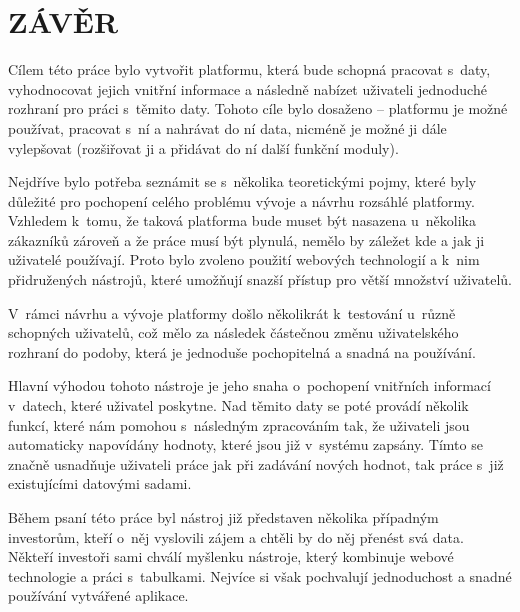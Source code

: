 \chapter*{ZÁVĚR}
\par Cílem této práce bylo vytvořit platformu, která bude schopná pracovat s~daty, vyhodnocovat jejich vnitřní informace a následně nabízet uživateli jednoduché rozhraní pro práci s~těmito daty. Tohoto cíle bylo dosaženo -- platformu je možné používat, pracovat s~ní a nahrávat do ní data, nicméně je možné ji dále vylepšovat (rozšiřovat ji a přidávat do ní další funkční moduly).

\par Nejdříve bylo potřeba seznámit se s~několika teoretickými pojmy, které byly důležité pro pochopení celého problému vývoje a návrhu rozsáhlé platformy. Vzhledem k~tomu, že taková platforma bude muset být nasazena u~několika zákazníků zároveň a že práce musí být plynulá, nemělo by záležet kde a jak ji uživatelé používají. Proto bylo zvoleno použití webových technologií a k~nim přidružených nástrojů, které umožňují snazší přístup pro větší množství uživatelů.

\par V~rámci návrhu a vývoje platformy došlo několikrát k~testování u~různě schopných uživatelů, což mělo za následek částečnou změnu uživatelského rozhraní do podoby, která je  jednoduše pochopitelná a snadná na používání.

\par Hlavní výhodou tohoto nástroje je jeho snaha o~pochopení vnitřních informací v~datech, které uživatel poskytne. Nad těmito daty se poté provádí několik funkcí, které nám pomohou s~následným zpracováním tak, že uživateli jsou automaticky napovídány hodnoty, které jsou již v~systému zapsány. Tímto se značně usnadňuje uživateli práce jak při zadávání nových hodnot, tak práce s~již existujícími datovými sadami.

\par Během psaní této práce byl nástroj již představen několika případným investorům, kteří o~něj vyslovili zájem a chtěli by do něj přenést svá data. Někteří investoři sami chválí myšlenku nástroje, který kombinuje webové technologie a práci s~tabulkami. Nejvíce si však pochvalují jednoduchost a snadné používání vytvářené aplikace.